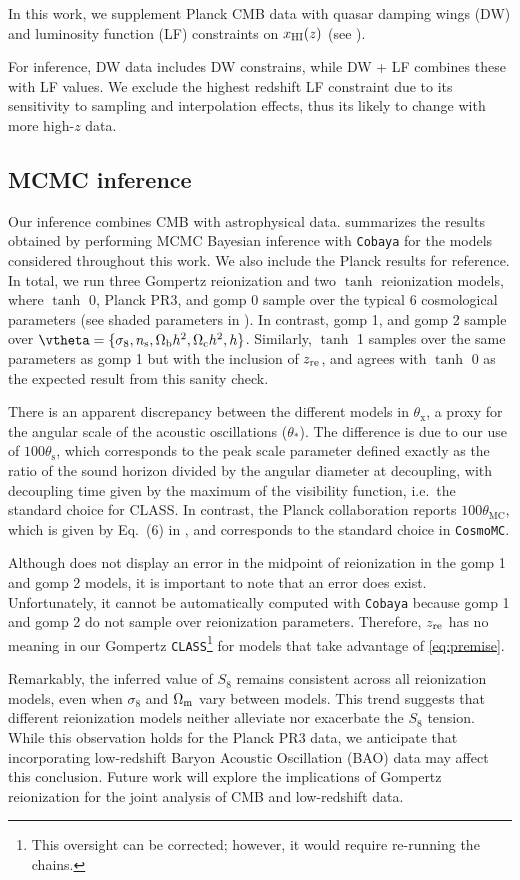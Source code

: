 In this work, we supplement Planck CMB data with quasar damping wings (DW) 
and luminosity function (LF) constraints on $x_{\mathrm{HI}} (z)$ (see ).

For inference, DW data includes DW constrains, while DW + LF combines
these with LF values. We exclude the highest redshift LF constraint due to
its sensitivity to sampling and interpolation effects, thus its likely to change
with more high-$z$ data. 


\subsection*{MCMC inference}
\label{ssec:fits}
Our inference combines CMB with astrophysical data.  
summarizes the results obtained by performing MCMC
Bayesian inference with \texttt{Cobaya} for the models considered
throughout this work.
We also include the Planck results \cite{Planck2020a} for reference.
In total, we run three Gompertz reionization and two $\tanh$
reionization models, where $\tanh$ 0, Planck PR3, and gomp 0 sample over
the typical 6 cosmological parameters (see shaded parameters in
).
In contrast, gomp 1, and gomp 2 sample over $\vtheta = \{\sigma_8, \ns,
\Omegab h^2, \Omegac h^2, h\}$.
Similarly, $\tanh$ 1 samples over the same parameters as gomp 1 but with
the inclusion of $z_{\mathrm{re}}$, and agrees with $\tanh$ 0 as the expected
result from this sanity check.

There is an apparent discrepancy between the different models in
$\theta_\mathrm{x}$, a proxy for the angular scale of the acoustic
oscillations ($\theta_*$).
The difference is due to our use of $100\theta_\mathrm{s}$, which
corresponds to the peak scale parameter defined exactly as the
ratio of the sound horizon divided by the angular diameter at
decoupling, with decoupling time given by the maximum of the visibility
function, i.e.\ the standard choice for CLASS.
In contrast, the Planck collaboration reports $100\theta_\mathrm{MC}$,
which is given by Eq.~(6) in \cite{Planck2014}, and corresponds to the
standard choice in \texttt{CosmoMC}\cite{Lewis2002}.

Although  does not display an error in the midpoint of
reionization in the gomp 1 and gomp 2 models, it is important to note that an error
does exist. Unfortunately, it cannot be automatically computed with \texttt{Cobaya} because
gomp 1 and gomp 2 do not sample over reionization parameters. Therefore,
$z_{\mathrm{re}}$ has no meaning in our Gompertz \texttt{CLASS}\footnote{This oversight
can be corrected; however, it would require re-running the chains.} for models
that take advantage of \cref{eq:premise}.

Remarkably, the inferred value of $S_8$ remains consistent across all reionization
models, even when $\sigma_8$ and $\Omega_\mathrm{m}$ vary between models. This trend
suggests that different reionization models neither alleviate nor exacerbate the $S_8$
tension. While this observation holds for the Planck PR3 data, we anticipate that
incorporating low-redshift Baryon Acoustic Oscillation (BAO) data may affect this
conclusion. Future work will explore the implications of Gompertz reionization
for the joint analysis of CMB and low-redshift data.


\FloatBarrier
